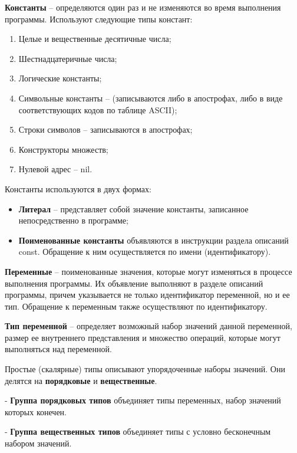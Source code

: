 {\bf{Константы}} – определяются один раз и не изменяются во время выполнения программы.
Используют следующие типы констант:
\begin{enumerate}
    \item Целые и вещественные десятичные числа;
    \item Шестнадцатеричные числа;
    \item Логические константы;
    \item Символьные константы – (записываются либо в апострофах, либо в виде соответствующих кодов по таблице ASCII);
    \item Строки символов – записываются в апострофах;
    \item Конструкторы множеств;
    \item Нулевой адрес – nil.
\end{enumerate}

Константы используются в двух формах: 
\begin{itemize}
    \item {\bf{Литерал}} – представляет собой значение константы, записанное непосредственно в программе;
    \item {\bf{Поименованные константы}} объявляются в инструкции раздела описаний const. Обращение к ним осуществляется по имени (идентификатору).
\end{itemize}

{\bf{Переменные}} – поименованные значения, которые могут изменяться в процессе выполнения программы. Их объявление выполняют в разделе описаний программы, причем указывается не только идентификатор переменной, но и ее тип. Обращение к переменным также осуществляют по идентификатору.

{\bf{Тип переменной}} – определяет возможный набор значений данной переменной, размер ее внутреннего представления и множество операций, которые могут выполняться над переменной.


Простые (скалярные) типы описывают упорядоченные наборы значений. Они делятся на {\bf порядковые} и {\bf вещественные}.

- {\bf {Группа порядковых типов}} объединяет типы переменных, набор значений которых конечен.

- {\bf {Группа вещественных типов}} объединяет типы с условно бесконечным набором значений.

